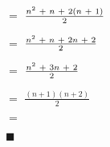 \documentclass[12pt]{article}
\renewcommand{\qedsymbol}{$\blacksquare$}
\begin{document}
\hspace{8.8cm} $=$ {\LARGE{{$\frac{n^{2} \hspace{0.1cm} + \hspace{0.1cm} n \hspace{0.1cm} + \hspace{0.1cm} 2(n\hspace{0.1cm}+\hspace{0.1cm}1)}{2}$}}} \vspace{0.5cm }

\hspace{8.8cm} $=$ {\LARGE{{$\frac{n^{2} \hspace{0.1cm} + \hspace{0.1cm} n \hspace{0.1cm} + \hspace{0.1cm} 2n\hspace{0.1cm}+\hspace{0.1cm}2}{2}$}}} \vspace{0.5cm }

\hspace{8.8cm} $=$ {\LARGE{{$\frac{n^{2} \hspace{0.1cm} + \hspace{0.1cm} 3n \hspace{0.1cm}+\hspace{0.1cm}2}{2}$}}} \vspace{0.5cm }

\hspace{8.8cm} $=$ {\LARGE{{$\frac{(n + 1)(n+2)}{2}$}}} \vspace{0.5cm }

\hspace{8.8cm} $=$  \vspace{0.2cm }

\hspace{9cm} \qedsymbol
\end{document}
